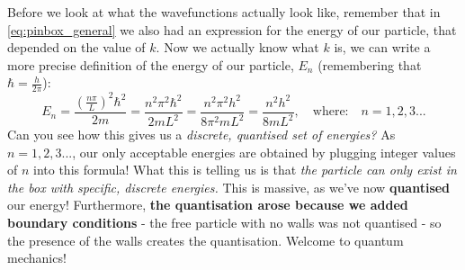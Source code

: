 \documentclass{memoir}[11pt,oneside,a4paper,openany]
\begin{document}
Before we look at what the wavefunctions actually look like, remember that in \autoref{eq:pinbox_general} we also had an expression for the energy of our particle, that depended on the value of $k$. Now we actually know what $k$ is, we can write a more precise definition of the energy of our particle, $E_n$ (remembering that $\hbar = \frac{h}{2\pi}$):
\begin{equation}
	E_n = \frac{(\frac{n\pi}{L})^2\hbar^2}{2m} = \frac{n^2\pi^2\hbar^2}{2mL^2} = \frac{n^2\pi^2h^2}{8\pi^2mL^2} = \frac{n^2h^2}{8mL^2},\quad\text{where:}\quad n=1,2,3... 
\end{equation}
Can you see how this gives us a \emph{discrete, quantised set of energies?} As $n = 1,2,3...$, our only acceptable energies are obtained by plugging integer values of $n$ into this formula! What this is telling us is that \emph{the particle can only exist in the box with specific, discrete energies.} This is massive, as we've now \textbf{quantised} our energy! Furthermore, \textbf{the quantisation arose because we added boundary conditions} - the free particle with no walls was not quantised - so the presence of the walls creates the quantisation. Welcome to quantum mechanics!
\end{document}
